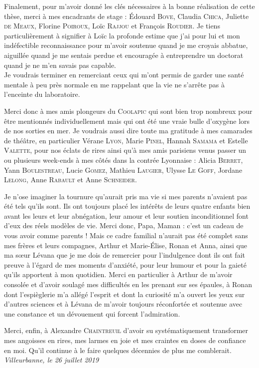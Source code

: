 Finalement, pour m'avoir donné les clés nécessaires à la bonne réalisation de cette thèse, merci à mes encadrants de stage :
\'Edouard \textsc{Bove},
Claudia \textsc{Chica},
Juliette \textsc{de Meaux},
Florine \textsc{Poiroux},
Loïc \textsc{Rajjou} et
François \textsc{Roudier}.
Je tiens particulièrement à signifier à Loïc la profonde estime que j'ai pour lui et mon indéfectible reconnaissance
pour m'avoir soutenue quand je me croyais abbatue, aiguillée quand je me sentais perdue et 
encouragée à entreprendre un doctorat quand je ne m'en savais pas capable.
\\







Je voudrais terminer en remerciant ceux qui m'ont permis de garder une santé mentale à peu près normale en me rappelant que la vie ne s'arrête pas à l'enceinte du laboratoire.

Merci donc à mes amis plongeurs du \textsc{Coolapic} qui sont bien trop nombreux pour être mentionnés individuellement mais qui ont été une vraie bulle d'oxygène lors de nos sorties en mer.
Je voudrais aussi dire toute ma gratitude à mes camarades de thé\^atre, en particulier Vérane \textsc{Lyon}, Marie \textsc{Pinel}, Hannah \textsc{Samama} et Estelle \textsc{Valette}, pour nos éclats de rires ainsi qu'à mes amis parisiens venus passer un ou plusieurs week-ends à mes côtés dans la contrée Lyonnaise : Alicia \textsc{Berret}, Yann \textsc{Boulestreau}, Lucie \textsc{Gomez}, Mathieu \textsc{Laugier}, Ulysse \textsc{Le Goff}, Jordane \textsc{Lelong}, Anne \textsc{Rabault} et Anne \textsc{Schneider}.


Je n'ose imaginer la tournure qu'aurait pris ma vie si mes parents n'avaient pas été tels qu'ils sont.
Ils ont toujours placé les intérêts de leurs quatre enfants bien avant les leurs et leur abnégation, leur amour et leur soutien inconditionnel font d'eux des réels modèles de vie.
Merci donc, Papa, Maman : c'est un cadeau de vous avoir comme parents !
Mais ce cadre familial n'aurait pas été complet sans mes frères et leurs compagnes, Arthur et Marie-\'Elise, Ronan et Anna, ainsi que ma sœur Lévana que je me dois de remercier pour l'indulgence dont ils ont fait preuve à l'égard de mes moments d'anxiété, pour leur humour et pour la gaieté qu'ils apportent à mon quotidien.
Merci en particulier à Arthur de m'avoir consolée et d'avoir soulagé mes difficultés en les prenant sur ses épaules, à Ronan dont l'espièglerie m'a allégé l'esprit et dont la curiosité m'a ouvert les yeux sur d'autres sciences et à Lévana de m'avoir toujours réconfortée et soutenue avec une constance et un dévouement qui forcent l'admiration.

Merci, enfin, à Alexandre \textsc{Chaintreuil} d'avoir su systématiquement transformer mes angoisses en rires, mes larmes en joie et mes craintes en doses de confiance en moi.
Qu'il continue à le faire quelques décennies de plus me comblerait.\\

\hfill \textit{Villeurbanne, le 26 juillet 2019}


